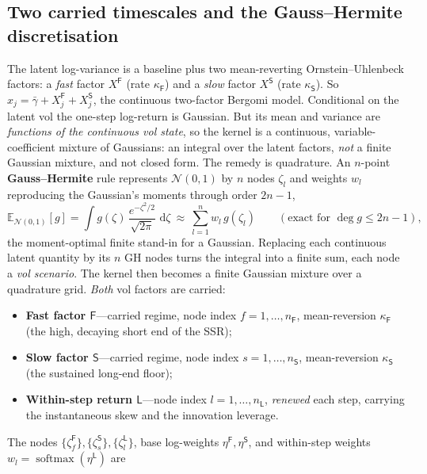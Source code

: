 \documentclass[11pt]{article}
\DeclareMathOperator{\softmax}{softmax}
\newcommand{\E}{\mathbb{E}}
\newcommand{\cN}{\mathcal{N}}
\newcommand{\dd}{\,\mathrm{d}}
\begin{document}
\subsection{Two carried timescales and the Gauss--Hermite discretisation}
The latent log-variance is a baseline plus two mean-reverting Ornstein--Uhlenbeck factors: a
\emph{fast} factor $X^{\mathsf{F}}$ (rate $\kappa_{\mathsf{F}}$) and a \emph{slow} factor $X^{\mathsf{S}}$ (rate $\kappa_{\mathsf{S}}$).
So $x_j=\bar\gamma+X^{\mathsf{F}}_j+X^{\mathsf{S}}_j$, the continuous two-factor Bergomi model. Conditional on the latent vol the one-step log-return is
Gaussian. But its mean and variance are \emph{functions of the continuous vol state}, so the
kernel is a continuous, variable-coefficient mixture of Gaussians: an integral over the
latent factors, \emph{not} a finite Gaussian mixture, and not closed form. The remedy is
quadrature. An $n$-point \textbf{Gauss--Hermite} rule represents $\cN(0,1)$ by $n$ nodes
$\zeta_l$ and weights $w_l$ reproducing the Gaussian's moments through order $2n-1$,
\begin{equation}
\E_{\cN(0,1)}[g]=\int g(\zeta)\,\frac{e^{-\zeta^2/2}}{\sqrt{2\pi}}\,\dd\zeta
   \ \approx\ \sum_{l=1}^{n} w_l\,g(\zeta_l)\qquad(\text{exact for }\deg g\le 2n-1),
\label{eq:gh}
\end{equation}
the moment-optimal finite stand-in for a Gaussian. Replacing each continuous latent quantity
by its $n$ GH nodes turns the integral into a finite sum, each node a \emph{vol scenario}.
The kernel then becomes a finite Gaussian mixture over a quadrature grid. \emph{Both}
vol factors are carried:
\begin{itemize}
  \item \textbf{Fast factor $\mathsf{F}$}---carried regime, node index $f=1,\dots,n_{\mathsf{F}}$, mean-reversion
    $\kappa_{\mathsf{F}}$ (the high, decaying short end of the SSR);
  \item \textbf{Slow factor $\mathsf{S}$}---carried regime, node index $s=1,\dots,n_{\mathsf{S}}$, mean-reversion
    $\kappa_{\mathsf{S}}$ (the sustained long-end floor);
  \item \textbf{Within-step return $\mathsf{L}$}---node index $l=1,\dots,n_{\mathsf{L}}$, \emph{renewed} each
    step, carrying the instantaneous skew and the innovation leverage.
\end{itemize}
The nodes $\{\zeta^{\mathsf{F}}_f\},\{\zeta^{\mathsf{S}}_s\},\{\zeta^{\mathsf{L}}_l\}$, base log-weights
$\eta^{\mathsf{F}},\eta^{\mathsf{S}}$, and within-step weights $w_l=\softmax(\eta^{\mathsf{L}})$ are
\end{document}
